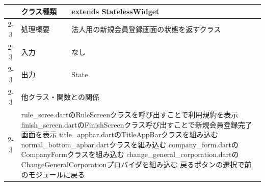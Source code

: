 \begin{table}[H]
\begin{tabular}{|c|l|l|}
                          & クラス種類                                                                              & extends StatelessWidget                                   \\ \cline{2-3}
                          & 処理概要                                                                               & \multicolumn{1}{p{12cm}|}{法人用の新規会員登録画面の状態を返すクラス}          \\ \cline{2-3}
                          & 入力                                                                                 & なし                                                        \\ \cline{2-3}
                          & 出力                                                                                 & State                                                     \\ \cline{2-3}
                          & \multicolumn{2}{l|}{他クラス・関数との関係}                                                                                                               \\ \cline{2-3}
                          & \multicolumn{2}{p{14cm}|}{
      rule\_scree.dartのRuleScreenクラスを呼び出すことで利用規約を表示
      \newline finish\_screen.dartのFinishScreenクラス呼び出すことで新規会員登録完了画面を表示
      \newline title\_appbar.dartのTitleAppBarクラスを組み込む
      \newline normal\_bottom\_apbar.dartクラスを組み込む
      \newline company\_form.dartのCompanyFormクラスを組み込む
      \newline change\_general\_corporation.dartのChangeGeneralCorporationプロバイダを組み込む
    \newline 戻るボタンの選択で前のモジュールに戻る}                                                                                                                                          \\ \hline

\end{tabular}
\end{table}
